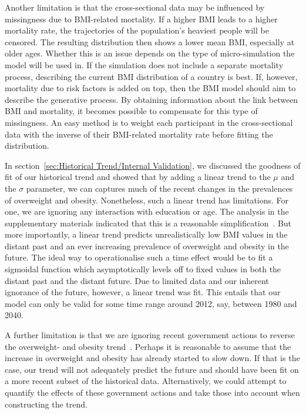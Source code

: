 \documentclass{imammb}
\numberwithin{equation}{section}
\begin{document}
Another limitation is that the cross-sectional data may be influenced by missingness due to BMI-related mortality. If a higher BMI leads to a higher mortality rate, the trajectories of the population's heaviest people will be censored. The resulting distribution then shows a lower mean BMI, especially at older ages. Whether this is an issue depends on the type of micro-simulation the model will be used in. If the simulation does not include a separate mortality process, describing the current BMI distribution of a country is best. If, however, mortality due to risk factors is added on top, then the BMI model should aim to describe the generative process. By obtaining information about the link between BMI and mortality, it becomes possible to compensate for this type of missingness. An easy method is to weight each participant in the cross-sectional data with the inverse of their BMI-related mortality rate before fitting the distribution.

In section~\ref{sec:Historical Trend/Internal Validation}, we discussed the goodness of fit of our historical trend and showed that by adding a linear trend to the $\mu$ and the $\sigma$ parameter, we can captures much of the recent changes in the prevalences of overweight and obesity. Nonetheless, such a linear trend has limitations. For one, we are ignoring any interaction with education or age. The analysis in the supplementary materials indicated that this is a reasonable simplification~\citep{Bogaardt2023}. But more importantly, a linear trend predicts unrealistically low BMI values in the distant past and an ever increasing prevalence of overweight and obesity in the future. The ideal way to operationalise such a time effect would be to fit a sigmoidal function which asymptotically levels off to fixed values in both the distant past and the distant future. Due to limited data and our inherent ignorance of the future, however, a linear trend was fit. This entails that our model can only be valid for some time range around 2012, say, between 1980 and 2040.

A further limitation is that we are ignoring recent government actions to reverse the overweight- and obesity trend~\citep{VWS2018, VanRinsum2018}. Perhaps it is reasonable to assume that the increase in overweight and obesity has already started to slow down. If that is the case, our trend will not adequately predict the future and should have been fit on a more recent subset of the historical data. Alternatively, we could attempt to quantify the effects of these government actions and take those into account when constructing the trend.
\end{document}

